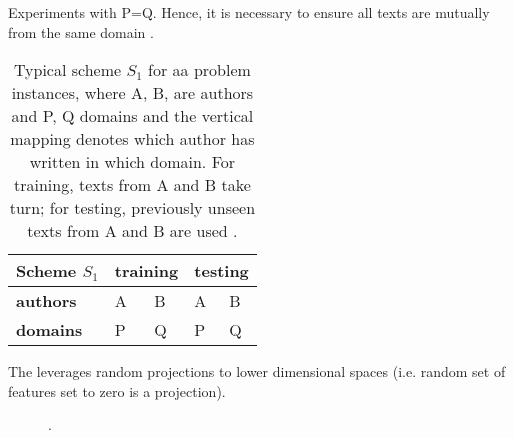 \begin{definition}
    Experiments with P=Q.
    Hence, it is necessary to ensure all texts are mutually from the same domain \citep{bischoff_importance_2020}.
    \begin{table}[tbp]
        \centering
        \caption{Typical scheme $S_1$ for \ac{aa} problem instances, where A, B, are authors and P, Q domains and 
        the vertical mapping denotes which author has written in which domain. 
        For training, texts from A and B take turn; for testing, previously unseen texts from A and B are used \citep{bischoff_importance_2020}.}
        \label{tab:within_domain_aa}
        \begin{tabular}{|l|ll|ll|}
        \hline
        \textbf{Scheme $S_1$} & \multicolumn{2}{l|}{\textbf{training}} & \multicolumn{2}{l|}{\textbf{testing}} \\ \hline
        \textbf{authors} & \multicolumn{1}{l|}{A} & B & \multicolumn{1}{l|}{A} & B \\ \hline
        \textbf{domains} & \multicolumn{1}{l|}{P} & Q & \multicolumn{1}{l|}{P} & Q \\ \hline
        \end{tabular}%
    \end{table}
\end{definition}


The \impAppr{} leverages random projections to lower dimensional spaces (i.e. random set of features set to zero is a projection).
\begin{figure}[htbp]
    \centering
    
    \caption{\imp{}.}
    \label{fig:impostor}
\end{figure}
